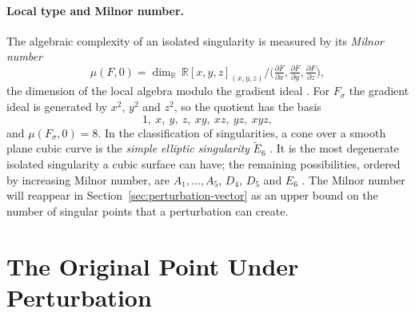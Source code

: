 \documentclass[12pt, a4paper, oneside]{book}
\theoremstyle{plain}
\theoremstyle{definition}
\theoremstyle{remark}
\begin{document}
\paragraph{Local type and Milnor number.}
The algebraic complexity of an isolated singularity is measured by its
\emph{Milnor number}
\begin{equation}
\label{eq:milnor-number}
\mu(F,0)=\dim_{\mathbb{R}}\,
\mathbb{R}[x,y,z]_{(x,y,z)}\big/\big(\tfrac{\partial F}{\partial x},
\tfrac{\partial F}{\partial y},\tfrac{\partial F}{\partial z}\big),
\end{equation}
the dimension of the local algebra modulo the gradient ideal
\cite{milnor1968singular,greuel2007introduction}. For $F_\sigma$ the gradient
ideal is generated by $x^2$, $y^2$ and $z^2$, so the quotient has the basis
\begin{equation}
\label{eq:milnor-basis}
1,\ x,\ y,\ z,\ xy,\ xz,\ yz,\ xyz,
\end{equation}
and $\mu(F_\sigma,0)=8$. In the classification of singularities, a cone over a
smooth plane cubic curve is the \emph{simple elliptic singularity}
$\tilde{E}_6$ \cite{arnold2012singularities}. It is the most degenerate
isolated singularity a cubic surface can have; the remaining possibilities,
ordered by increasing Milnor number, are $A_1,\dots,A_5$, $D_4$, $D_5$ and
$E_6$ \cite{bruce1979classification}. The Milnor number will reappear in
Section~\ref{sec:perturbation-vector} as an upper bound on the number of singular
points that a perturbation can create.

\section{The Original Point Under Perturbation}
\label{sec:taylor-perturbation}
\end{document}
